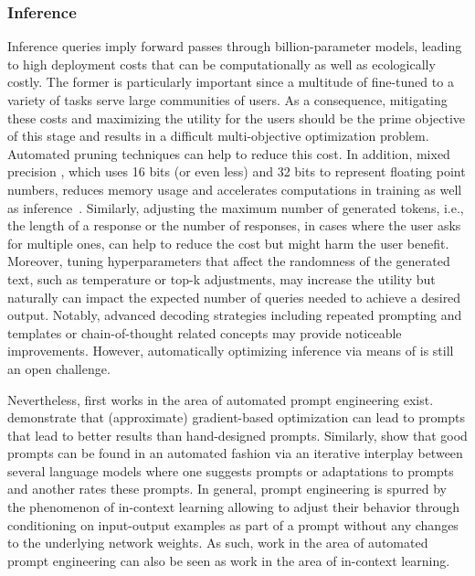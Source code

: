 \subsubsection{Inference}

Inference queries imply forward passes through billion-parameter models, leading to high deployment costs that can be computationally as well as ecologically costly. 
The former is particularly important since a multitude of \LLMs fine-tuned to a variety of tasks serve large communities of users.
As a consequence, mitigating these costs and maximizing the utility for the users should be the prime objective of this stage and results in a difficult multi-objective optimization problem.
Automated pruning techniques \cite{chen-ijcai20, wang-emnlp20a} can help to reduce this cost. In addition, mixed precision \cite{shen-aaai2020a, dettmers-arxiv2022a}, which uses 16 bits (or even less) and 32 bits to represent floating point numbers, reduces memory usage and accelerates computations in training as well as inference~\cite{Yuan-air23a}.
Similarly, adjusting the maximum number of generated tokens, i.e., the length of a response or the number of responses, in cases where the user asks for multiple ones, can help to reduce the cost but might harm the user benefit.
Moreover, tuning hyperparameters that affect the randomness of the generated text, such as temperature or top-k adjustments, may increase the utility but naturally can impact the expected number of queries needed to achieve a desired output. 
Notably, advanced decoding strategies \cite{zhao-arxiv23a} including repeated prompting and templates or chain-of-thought related concepts \cite{besta-arxiv23a,ning-arxi23a} may provide noticeable improvements. However, automatically optimizing inference via means of \AutoML is still an open challenge.

Nevertheless, first works in the area of automated prompt engineering exist. \citet{shin-emnlp20a} demonstrate that (approximate) gradient-based optimization can lead to prompts that lead to better results than hand-designed prompts. Similarly, \citet{zhou-iclr23a} show that good prompts can be found in an automated fashion via an iterative interplay between several language models where one \LLM suggests prompts or adaptations to prompts and another \LLM rates these prompts. In general, prompt engineering is spurred by the phenomenon of in-context learning\cite{brown-neurips20a} allowing \LLMs to adjust their behavior through conditioning on input-output examples as part of a prompt without any changes to the underlying network weights. As such, work in the area of automated prompt engineering can also be seen as work in the area of in-context learning.

